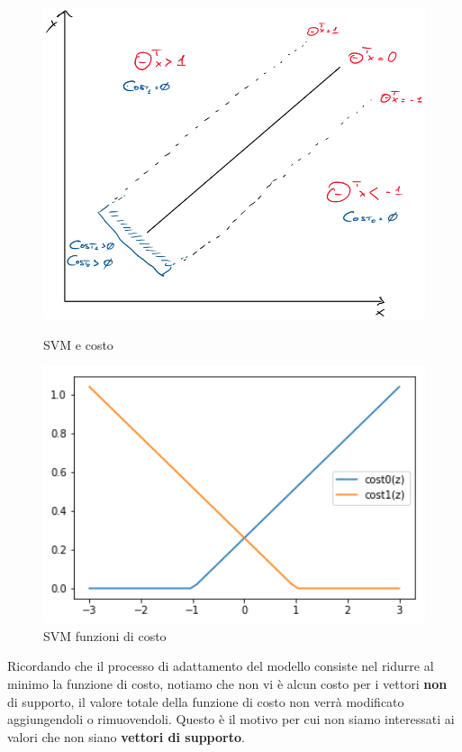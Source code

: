 \begin{figure}[!htb]
   \begin{minipage}{0.48\textwidth}
     \centering
    \includegraphics[width=1\textwidth]{img/SVMCostExample.png}
    \caption{SVM e costo}
    \label{fig:svmCost}
   \end{minipage}\hfill
   \begin{minipage}{0.48\textwidth}
     \centering
  \includegraphics[width=1\textwidth]{img/cost-plots-SVM.png}
    \caption{SVM funzioni di costo}
    \label{fig:SVMCostPlots}
   \end{minipage}
\end{figure}
Ricordando che il processo di adattamento del modello consiste nel ridurre al minimo la funzione di costo, notiamo che non vi è alcun costo per i vettori \textbf{non} di supporto, il valore totale della funzione di costo non verrà modificato aggiungendoli o rimuovendoli. Questo è il motivo per cui non siamo interessati ai valori che non siano \textbf{vettori di supporto}.
